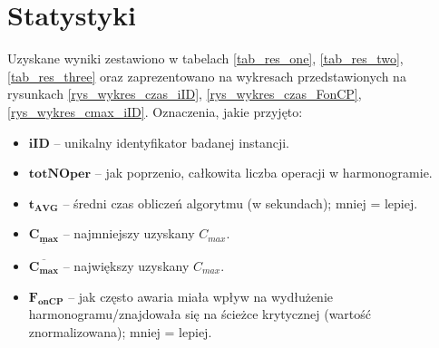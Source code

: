 \documentclass[printmode,oneside]{mgr}
\begin{document}
\section{Statystyki}
Uzyskane wyniki zestawiono w tabelach \ref{tab_res_one}, \ref{tab_res_two}, \ref{tab_res_three} oraz zaprezentowano na wykresach przedstawionych na rysunkach \ref{rys_wykres_czas_iID}, \ref{rys_wykres_czas_FonCP}, \ref{rys_wykres_cmax_iID}. Oznaczenia, jakie przyjęto:
\begin{itemize}
	\item $\mathbf{iID}$ -- unikalny identyfikator badanej instancji.
	\item $\mathbf{totNOper}$ -- jak poprzenio, całkowita liczba operacji w harmonogramie.
	\item $\mathbf{t_{AVG}}$ -- średni czas obliczeń algorytmu (w sekundach); mniej = lepiej.
	\item $\mathbf{\underline{C_{max}}}$ -- najmniejszy uzyskany $C_{max}$.
	\item $\mathbf{\overline{C_{max}}}$ -- największy uzyskany $C_{max}$.
	\item $\mathbf{F_{onCP}}$ -- jak często awaria miała wpływ na wydłużenie harmonogramu/znajdowała się na ścieżce krytycznej (wartość znormalizowana); mniej = lepiej.
\end{itemize}
\end{document}
